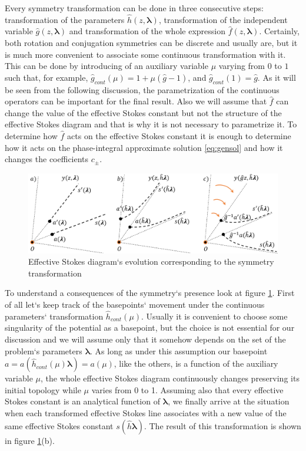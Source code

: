 \documentclass[atmp]{ipart_v1}
\def\f{\hat{f}}
\def\g{\hat{g}}
\def\h{\hat{h}}
\def\lmbd{\bm{\lambda}}
\def\unity{1}
\newcommand\eref[1]{\eqref{#1}}
\newcommand\fref[1]{figure \ref{#1}}
\begin{document}
Every symmetry transformation can be done in three consecutive steps: transformation 
of the parameters $\h(z,\lmbd)$, transformation of the independent variable $\g(z,\lmbd)$ and 
transformation of the whole expression $\f(z,\lmbd)$. 
Certainly, both rotation and conjugation symmetries can be discrete and 
usually are, but it is much more convenient to associate some continuous transformation 
with it. This can be done by introducing of an auxiliary variable $\mu$ varying from $0$ 
to $1$ such that, for example, $\g_{cont}(\mu)=\unity+\mu (\g-\unity)$, and $\g_{cont}(1)=\g$. 
As it will be seen from the following discussion, the parametrization of the 
continuous operators can be important for the final result. Also we will assume that $\f$ can 
change the value of the effective Stokes constant but not the structure of the effective Stokes diagram and 
that is why it is not necessary to parametrize it. To determine how $\f$ acts on the 
effective Stokes constant it is enough to determine how it acts on the phase-integral approximate 
solution \eref{eq:gensol} and how it changes the coefficients $c_\pm$.

\begin{figure}
\centering
\noindent
\includegraphics[width=\textwidth]{stuff/rs.png}
\caption{Effective Stokes diagram`s evolution corresponding to the symmetry transformation}
\label{fig:rst}
\end{figure}

To understand a consequences of the symmetry`s presence look at \fref{fig:rst}. 
First of all let`s keep track of the basepoints` movement under the continuous parameters` 
transformation $\h_{cont}(\mu)$. Usually it is convenient to choose some singularity of the 
potential as a basepoint, but the choice is not essential for our discussion and we will assume 
only that it somehow depends on the set of the problem`s parameters $\lmbd$. As long as under 
this assumption our basepoint $a=a(\h_{cont}(\mu)\lmbd)=a(\mu)$, like the others, is a function 
of the auxiliary variable $\mu$, the whole effective Stokes diagram continuously changes preserving its 
initial topology while $\mu$ varies from 0 to 1. Assuming also that every effective Stokes constant is 
an analytical function of $\lmbd$, we finally arrive at the situation when each transformed effective Stokes 
line associates with a new value of the same effective Stokes constant $s(\h\lmbd)$. The result of this 
transformation is shown in \fref{fig:rst}(b). 
\end{document}
